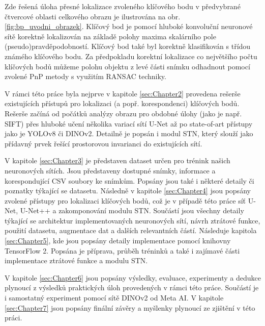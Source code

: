 Zde řešená úloha přesné lokalizace zvoleného klíčového bodu v předvybrané čtvercové oblasti celkového obrazu je ilustrována na obr. \ref{fig:bp_uvodni_obrazek}. Klíčový bod je pomocí hluboké konvoluční neuronové sítě korektně lokalizován na základě polohy maxima skalárního pole (pseudo)pravděpodobností. Klíčový bod také byl korektně klasifikován s třídou známého klíčového bodu. Za předpokladu korektní lokalizace co největšího počtu klíčových bodů můžeme polohu objektu z levé části snímku odhadnout pomocí zvolené PnP metody s využitím RANSAC techniky.

V rámci této práce byla nejprve v kapitole \ref{sec:Chapter2} provedena rešerše existujících přístupů pro lokalizaci (a popř. korespondenci) klíčových bodů. Rešerše začíná od počátků analýzy obrazu pro obdobné úlohy (jako je např. SIFT) přes hluboké učení několika variací sítí U-Net až po state-of-art přístupy jako je YOLOv8 či DINOv2. Detailně je popsán i modul STN, který slouží jako přídavný prvek řešící prostorovou invarianci do existujících sítí.

V kapitole \ref{sec:Chapter3} je představen dataset určen pro trénink našich neuronových sítích. Jsou představeny dostupné snímky, informace a korespondující CSV soubory ke snímkům. Popsány jsou také i některé detaily či poznatky týkající se datasetu. Následně v kapitole \ref{sec:Chapter4} jsou popsány zvolené přístupy pro lokalizaci klíčových bodů, což je v případě této práce síť U-Net, U-Net++ a zakomponování modulu STN. Součástí jsou všechny detaily týkající se architektur implementovaných neuronových sítí, návrh ztrátové funkce, použití datasetu, augmentace dat a dalších relevantních částí. Následuje kapitola \ref{sec:Chapter5}, kde jsou popsány detaily implementace pomocí knihovny TensorFlow 2. Popsána je příprava, průběh tréninků a také i zajímavé části implementace ztrátové funkce a modulu STN.

V kapitole \ref{sec:Chapter6} jsou popsány výsledky, evaluace, experimenty a dedukce plynoucí z výsledků praktických úloh provedených v rámci této práce. Součástí je i samostatný experiment pomocí sítě DINOv2 od Meta AI. V kapitole \ref{sec:Chapter7} jsou popsány finální závěry a myšlenky plynoucí ze zjištění v této práci.
\endinput
